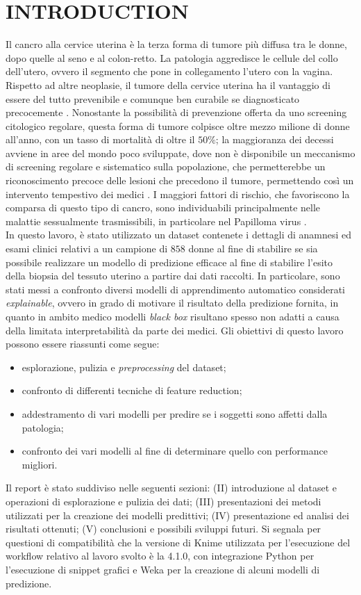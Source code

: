 \section{INTRODUCTION}
Il cancro alla cervice uterina è la terza forma di tumore più diffusa tra le donne, dopo quelle al seno e al colon-retto. La patologia aggredisce le cellule del collo dell’utero, ovvero il segmento che pone in collegamento l’utero con la vagina. Rispetto ad altre neoplasie, il tumore della cervice uterina ha il vantaggio di essere del tutto prevenibile e comunque ben curabile se diagnosticato precocemente \cite{veronesi}.
Nonostante la possibilità di prevenzione offerta da uno screening citologico regolare, questa forma di tumore colpisce oltre mezzo milione di donne all'anno, con un tasso di mortalità di oltre il $50\%$; la maggioranza dei decessi avviene in aree del mondo poco sviluppate, dove non è disponibile un meccanismo di screening regolare e sistematico sulla popolazione, che permetterebbe un riconoscimento precoce delle lesioni che precedono il tumore, permettendo così un intervento tempestivo dei medici \cite{paper}.
I maggiori fattori di rischio, che favoriscono la comparsa di questo tipo di cancro, sono individuabili principalmente nelle malattie sessualmente trasmissibili, in particolare nel Papilloma virus \cite{veronesi}.\\
In questo lavoro, è stato utilizzato un dataset contenete i dettagli di anamnesi ed esami clinici relativi a un campione di $858$ donne al fine di stabilire se sia possibile realizzare un modello di predizione efficace al fine di stabilire l'esito della biopsia del tessuto uterino a partire dai dati raccolti.
In particolare, sono stati messi a confronto diversi modelli di apprendimento automatico considerati \textit{explainable}, ovvero in grado di motivare il risultato della predizione fornita, in quanto in ambito medico modelli \textit{black box} risultano spesso non adatti a causa della limitata interpretabilità da parte dei medici.
Gli obiettivi di questo lavoro possono essere riassunti come segue:
\begin{itemize}
	\item esplorazione, pulizia e \textit{preprocessing} del dataset;
	\item confronto di differenti tecniche di feature reduction;
	\item addestramento di vari modelli per predire se i soggetti sono affetti dalla patologia;
	\item confronto dei vari modelli al fine di determinare quello con performance migliori.
\end{itemize}
Il report è stato suddiviso nelle seguenti sezioni: (II) introduzione al dataset e operazioni di esplorazione e pulizia dei dati; (III) presentazioni dei metodi utilizzati per la creazione dei modelli predittivi; (IV) presentazione ed analisi dei risultati ottenuti; (V) conclusioni e possibili sviluppi futuri.
Si segnala per questioni di compatibilità che la versione di Knime utilizzata per l'esecuzione del workflow relativo al lavoro svolto è la 4.1.0, con integrazione Python per l'esecuzione di snippet grafici e Weka per la creazione di alcuni modelli di predizione. 